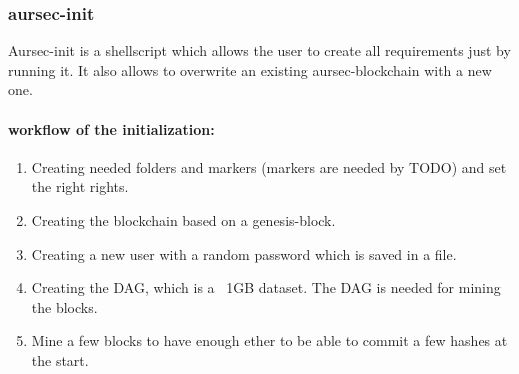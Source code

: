 \subsubsection{aursec-init}
Aursec-init is a shellscript which allows the user to create all requirements just by running it. It also allows to overwrite an existing aursec-blockchain with a new one.

\paragraph*{workflow of the initialization:}
\begin{enumerate}
	\item Creating needed folders and markers (markers are needed by TODO) and set the right rights.
	\item Creating the blockchain based on a genesis-block.
	\item Creating a new user with a random password which is saved in a file.
	\item Creating the DAG, which is a ~1GB dataset. The DAG is needed for mining the blocks. \cite{wiki:DAG}
	\item Mine a few blocks to have enough ether to be able to commit a few hashes at the start.
\end{enumerate}
